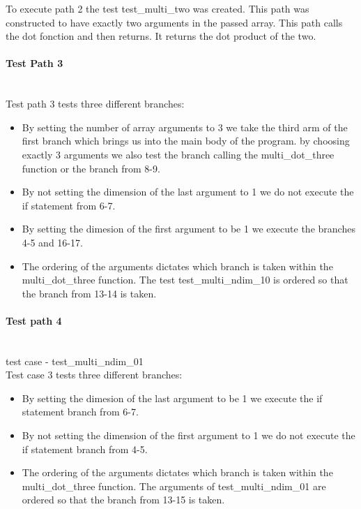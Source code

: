 To execute path 2 the test test\_multi\_two was created. This path was constructed to have exactly two arguments in the passed array.
This path calls the dot fonction and then returns. It returns the dot product of the two.


\paragraph{Test Path 3}\\

Test path 3 tests three different branches:\\
\begin{itemize}
\item By setting the number of array arguments to 3 we take the third arm of the first branch which brings us into the main body of the program. by choosing exactly 3 arguments we also test the branch calling the multi\_dot\_three function or the branch from 8-9.
\item By not setting the dimension of the last argument to 1 we do not execute the if statement from 6-7.
\item By setting the dimesion of the first argument to be 1 we execute the branches 4-5 and 16-17.
\item The ordering of the arguments dictates which branch is taken within the multi\_dot\_three function. The test test\_multi\_ndim\_10 is ordered so that the branch from 13-14 is taken. 
\end{itemize}


\paragraph{Test path 4}\\
test case - test\_multi\_ndim\_01\\
Test case 3 tests three different branches:\\
\begin{itemize}
\item By setting the dimesion of the last argument to be 1  we execute the if statement branch from  6-7.
\item By not setting the dimension of the first argument to 1 we do not execute the if statement branch from 4-5.
\item The ordering of the arguments dictates which branch is taken within the multi\_dot\_three function. The arguments of test\_multi\_ndim\_01 are ordered so that the branch from 13-15 is taken. 
\end{itemize}



